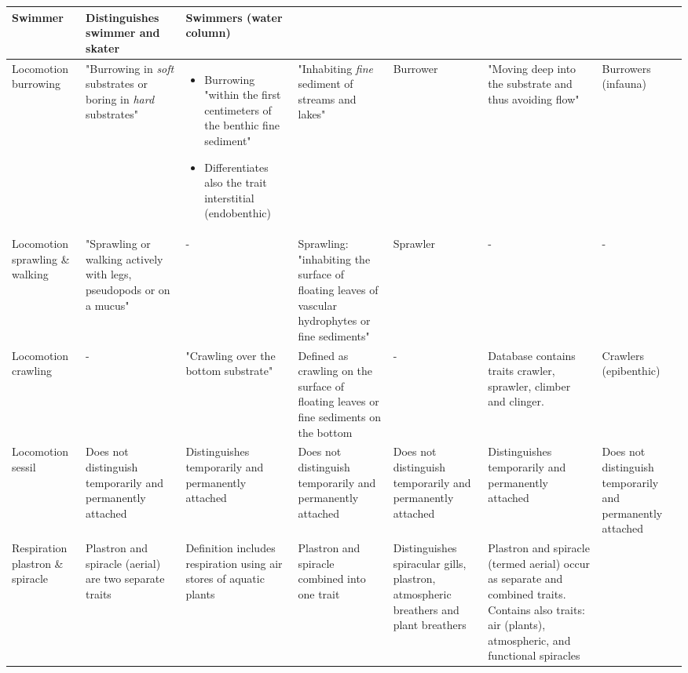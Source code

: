 \documentclass[12pt]{article}
\begin{document}
\begin{landscape}
\begin{longtable}{m{1.9cm}|m{3.3cm}|m{3.3cm}|m{2.7cm}|m{3cm}|m{3.2cm}|m{2.5cm}}
        Swimmer & 
        Distinguishes swimmer and skater & 
        Swimmers (water column)
        \\
        \midrule
        Locomotion burrowing & 
        "Burrowing in \textit{soft} substrates or boring in \textit{hard} substrates" & 
        \begin{itemize}
            \item Burrowing "within the first centimeters of the benthic fine sediment"
            \item Differentiates also the trait interstitial (endobenthic)
        \end{itemize} & 
        "Inhabiting \textit{fine} sediment of streams and lakes" &
        Burrower & 
        "Moving deep into the substrate and thus avoiding flow" &
        Burrowers (infauna)
        \\
        \midrule
        Locomotion sprawling \& walking & 
        "Sprawling or walking actively with legs, pseudopods or on a mucus" &
        - & 
        Sprawling: "inhabiting the surface of floating leaves of vascular hydrophytes or fine sediments" & 
        Sprawler &
        - & 
        - \\
        \midrule
        Locomotion crawling & 
        - &
        "Crawling over the bottom substrate" & 
        Defined as crawling on the surface of floating leaves or fine sediments on the bottom & 
        - & 
        Database contains traits crawler, 
        sprawler, climber and clinger. &
        Crawlers (epibenthic) \\
        \midrule
        Locomotion sessil & 
        Does not distinguish temporarily and permanently attached & 
        Distinguishes temporarily and permanently attached & 
        Does not distinguish temporarily and permanently attached & 
        Does not distinguish temporarily and permanently attached & 
        Distinguishes temporarily and permanently attached & 
        Does not distinguish temporarily and permanently attached \\
        \toprule[.1em]
        Respiration plastron \& spiracle & 
        Plastron and spiracle (aerial) are two separate traits & 
        Definition includes respiration using air stores of aquatic plants & 
        Plastron and spiracle combined into one trait & 
        Distinguishes spiracular gills, plastron, atmospheric breathers and plant breathers &
        Plastron and spiracle (termed aerial) occur as separate and combined traits. Contains also traits: air (plants), atmospheric, and functional spiracles &

\end{longtable}
\end{landscape}
\end{document}
